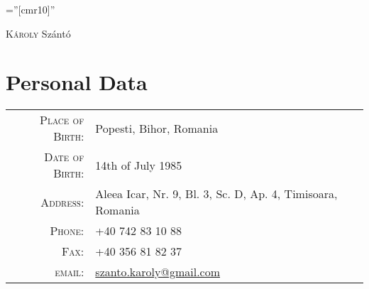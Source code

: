 \documentclass[a4paper,10pt]{article}
\begin{document}
\pagestyle{plain} %

\font\fb=''[cmr10]'' %

 
\par{\centering
		{\Huge \textsc{K\'aroly} Sz\'ant\'o
	}\bigskip\par}
	
\section{Personal Data}

\begin{tabular}{rl}
    \textsc{Place of Birth:} & Popesti, Bihor, Romania\\
    \textsc{Date of Birth:}  & 14th of July 1985 \\
    \textsc{Address:}         &  Aleea Icar, Nr. 9, Bl. 3, Sc. D, Ap. 4, Timisoara, Romania\\
    \textsc{Phone:}     	 & +40 742 83 10 88\\
    \textsc{Fax:}			 & +40 356 81 82 37\\
    \textsc{email:}     	 &
    \href{mailto:szanto.karoly@gmail.com}{szanto.karoly@gmail.com}
\end{tabular}

\end{document}
